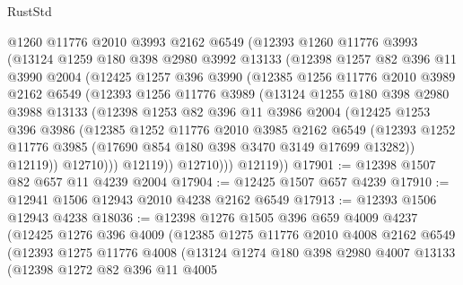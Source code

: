 \begin{lexlean}{RustStd}
\begin{coremodule}
        @1260
        @11776
        @2010
        @3993
        @2162
        @6549
        (@12393
          @1260
          @11776
          @3993
          (@13124
            @1259
            @180
            @398
            @2980
            @3992
            @13133
            (@12398
              @1257
              @82
              @396
              @11
              @3990
              @2004
              (@12425
                @1257
                @396
                @3990
                (@12385
                  @1256
                  @11776
                  @2010
                  @3989
                  @2162
                  @6549
                  (@12393
                    @1256
                    @11776
                    @3989
                    (@13124
                      @1255
                      @180
                      @398
                      @2980
                      @3988
                      @13133
                      (@12398
                        @1253
                        @82
                        @396
                        @11
                        @3986
                        @2004
                        (@12425
                          @1253
                          @396
                          @3986
                          (@12385
                            @1252
                            @11776
                            @2010
                            @3985
                            @2162
                            @6549
                            (@12393
                              @1252
                              @11776
                              @3985
                              (@17690 @854 @180 @398 @3470 @3149 @17699 @13282))
                            @12119))
                        @12710)))
                  @12119))
              @12710)))
        @12119))
@17901 := @12398 @1507 @82 @657 @11 @4239 @2004
@17904 := @12425 @1507 @657 @4239
@17910 := @12941 @1506 @12943 @2010 @4238 @2162 @6549
@17913 := @12393 @1506 @12943 @4238
@18036 := @12398
    @1276
    @1505
    @396
    @659
    @4009
    @4237
    (@12425
      @1276
      @396
      @4009
      (@12385
        @1275
        @11776
        @2010
        @4008
        @2162
        @6549
        (@12393
          @1275
          @11776
          @4008
          (@13124
            @1274
            @180
            @398
            @2980
            @4007
            @13133
            (@12398
              @1272
              @82
              @396
              @11
              @4005

\end{coremodule}
\end{lexlean}
